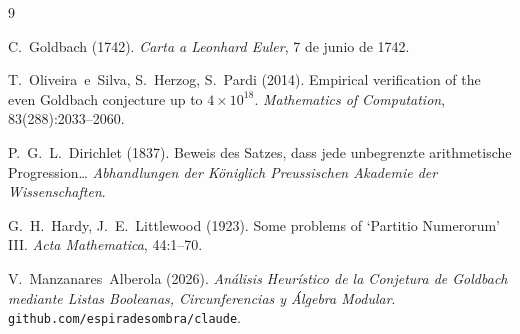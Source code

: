 \documentclass[11pt,a4paper]{article}
\theoremstyle{definition}
\begin{document}
\begin{thebibliography}{9}

C.~Goldbach (1742).
\textit{Carta a Leonhard Euler}, 7 de junio de 1742.

T.~Oliveira~e~Silva, S.~Herzog, S.~Pardi (2014).
Empirical verification of the even Goldbach conjecture up to $4\times10^{18}$.
\textit{Mathematics of Computation}, 83(288):2033--2060.

P.~G.~L.~Dirichlet (1837).
Beweis des Satzes, dass jede unbegrenzte arithmetische Progression\ldots
\textit{Abhandlungen der Königlich Preussischen Akademie der Wissenschaften}.

G.~H.~Hardy, J.~E.~Littlewood (1923).
Some problems of `Partitio Numerorum' III.
\textit{Acta Mathematica}, 44:1--70.

V.~Manzanares~Alberola (2026).
\textit{Análisis Heurístico de la Conjetura de Goldbach mediante Listas
Booleanas, Circunferencias y Álgebra Modular}.
\texttt{github.com/espiradesombra/claude}.

\end{thebibliography}
\end{document}
